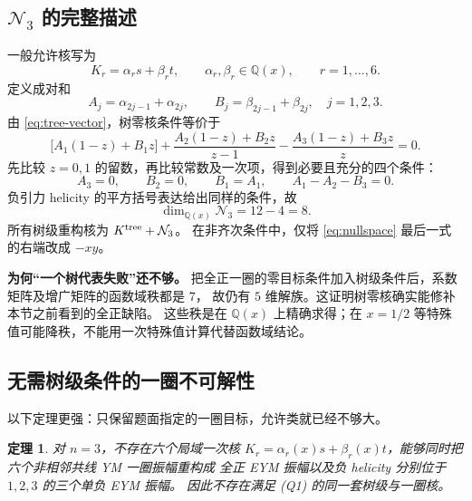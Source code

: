\documentclass[UTF8,a4paper,11pt,fontset=fandol]{ctexart}
\newcommand{\QQ}{\mathbb Q}
\newtheorem{theorem}{定理}
\begin{document}
\subsection{\texorpdfstring{$\mathcal N_3$}{N3} 的完整描述}
一般允许核写为
\begin{equation}
 K_r=\alpha_r s+\beta_r t,\qquad
 \alpha_r,\beta_r\in\QQ(x),\qquad r=1,\ldots,6.
\end{equation}
定义成对和
\begin{equation}
 A_j=\alpha_{2j-1}+\alpha_{2j},\qquad
 B_j=\beta_{2j-1}+\beta_{2j},\quad j=1,2,3.
\end{equation}
由 \eqref{eq:tree-vector}，树零核条件等价于
\begin{equation}
 \big[A_1(1-z)+B_1z\big]
 +\frac{A_2(1-z)+B_2z}{z-1}
 -\frac{A_3(1-z)+B_3z}{z}=0.
\end{equation}
先比较 $z=0,1$ 的留数，再比较常数及一次项，得到必要且充分的四个条件：
\begin{equation}
 \boxed{A_3=0,\qquad B_2=0,\qquad B_1=A_1,\qquad A_1-A_2-B_3=0.}
\label{eq:nullspace}
\end{equation}
负引力 helicity 的平方括号表达给出同样的条件，故
\begin{equation}
 \boxed{\dim_{\QQ(x)}\mathcal N_3=12-4=8.}
\end{equation}
所有树级重构核为 $K^{\rm tree}+\mathcal N_3$。
在非齐次条件中，仅将 \eqref{eq:nullspace} 最后一式的右端改成 $-xy$。

\textbf{为何“一个树代表失败”还不够。}
把全正一圈的零目标条件加入树级条件后，系数矩阵及增广矩阵的函数域秩都是 $7$，
故仍有 $5$ 维解族。这证明树零核确实能修补本节之前看到的全正缺陷。
这些秩是在 $\QQ(x)$ 上精确求得；在 $x=1/2$ 等特殊值可能降秩，不能用一次特殊值计算代替函数域结论。

\subsection{无需树级条件的一圈不可解性}
以下定理更强：只保留题面指定的一圈目标，允许类就已经不够大。

\begin{theorem}\label{thm:nogo}
对 $n=3$，不存在六个局域一次核
$K_r=\alpha_r(x)s+\beta_r(x)t$，能够同时把六个非相邻共线 YM 一圈振幅重构成
全正 EYM 振幅以及负 helicity 分别位于 $1,2,3$ 的三个单负 EYM 振幅。
因此不存在满足 (Q1) 的同一套树级与一圈核。
\end{theorem}
\end{document}
